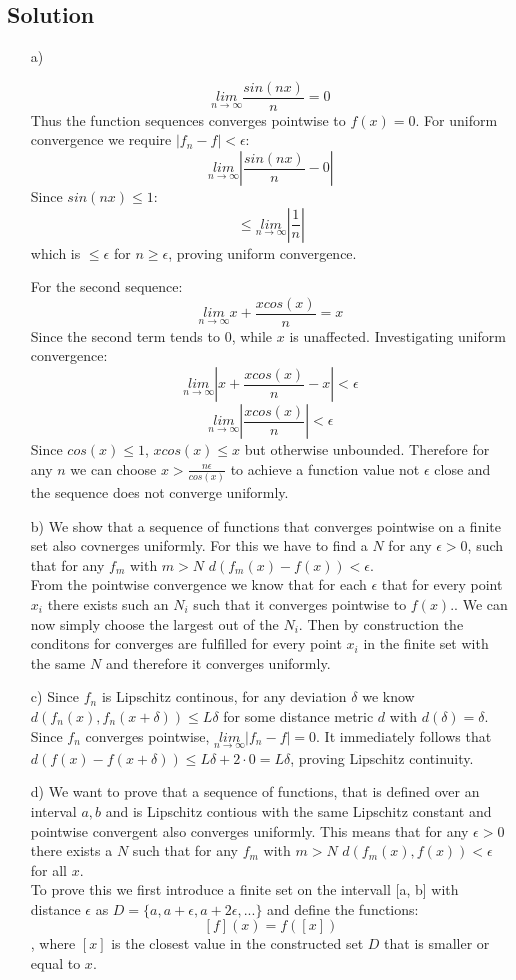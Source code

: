\documentclass[10pt]{article}
\numberwithin{equation}{section}
\newcommand{\limn}{\underset{n\rightarrow \infty}{lim}}
\begin{document}
\subsection*{Solution}
\begin{enumerate}
\item[a)]{
    $$\limn \frac{sin(nx)}{n} = 0$$
    Thus the function sequences converges pointwise to $f(x) = 0$.
    For uniform convergence we require $|f_n - f| < \epsilon$:
    $$\limn |\frac{sin(nx)}{n} - 0|$$
    Since $sin(nx) \leq 1$:
    $$ \leq \limn |\frac{1}{n}|$$
    which is $\leq \epsilon$ for $n\geq \epsilon$, proving uniform convergence.

    For the second sequence:
    $$\limn x + \frac{x cos(x)}{n} = x$$
    Since the second term tends to 0, while $x$ is unaffected.
    Investigating uniform convergence:
    $$\limn |x + \frac{x cos(x)}{n} - x| < \epsilon$$
    $$\limn |\frac{x cos(x)}{n}| < \epsilon$$
    Since $cos(x) \leq 1$, $x cos(x) \leq x$ but otherwise unbounded. Therefore for any $n$ we can choose $x > \frac{n\epsilon}{cos(x)}$ to achieve a function value not $\epsilon$ close and the sequence does not converge uniformly.

  }
\item[b)]{
		We show that a sequence of functions that converges pointwise on a finite set also covnerges uniformly. For this we have to find a $N$ for any $\epsilon>0$, such that for any $f_m$ with $m>N$ $d(f_m(x) -f(x)) < \epsilon$. \\
		From the pointwise convergence we know that for each $\epsilon$ that for every point $x_i$ there exists such an $N_i$ such that it converges pointwise to $f(x)$.. We can now simply choose the largest out of the $N_i$. Then by construction the conditons for converges  are fulfilled for every point $x_i$ in the finite set with the same $N$ and therefore it converges uniformly.  
  }
\item[c)]{
    Since $f_n$ is Lipschitz continous, for any deviation $\delta$ we know $d(f_n(x), f_n(x+\delta)) \leq L\delta$ for some distance metric $d$ with $d(\delta) = \delta$.
    Since $f_n$ converges pointwise, $\limn |f_n - f| = 0$.
    It immediately follows that $d(f(x) - f(x+\delta)) \leq L\delta + 2\cdot 0 = L\delta$, proving Lipschitz continuity.
  }
\item[d)]{
		We want to prove that a sequence of functions, that is defined over an interval $a, b$ and is Lipschitz contious with the same Lipschitz constant and pointwise convergent also converges uniformly.
		This means that for any $\epsilon >0$ there exists a $N$  such that for any $f_m$ with $m>N$   $d(f_m(x), f(x)) < \epsilon$ for all $x$. \\
		To prove this we first introduce a finite set on the intervall [a, b] with distance $\epsilon$ as $D = \{a, a+\epsilon, a+2\epsilon, ...\}$ and define the functions:
		$$[f](x) = f([x])$$, where $[x]$ is the closest value in the constructed set $D$ that is smaller or equal to $x$. \\

}
\end{enumerate}
\end{document}
